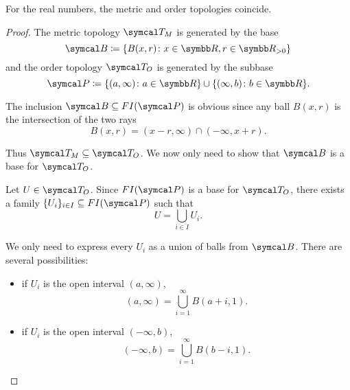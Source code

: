 \begin{theorem}\label{thm:real_metric_and_order_topologies_coincide}
  For the real numbers, the metric and order topologies coincide.
\end{theorem}
\begin{proof}
  The metric topology \( \Cal{T}_M \) is generated by the base
  \begin{equation*}
    \Cal{B} \coloneqq \{ B(x, r) \colon x \in \BR, r \in \BR_{>0} \}
  \end{equation*}
  and the order topology \( \Cal{T}_O \) is generated by the subbase
  \begin{equation*}
    \Cal{P} \coloneqq \{ (a, \infty) \colon a \in \BR \} \cup \{ (\infty, b) \colon b \in \BR \}.
  \end{equation*}

  The inclusion \( \Cal{B} \subseteq FI(\Cal{P}) \) is obvious since any ball \( B(x, r) \) is the intersection of the two rays
  \begin{equation*}
    B(x, r) = (x - r, \infty) \cap (-\infty, x + r).
  \end{equation*}

  Thus \( \Cal{T}_M \subseteq \Cal{T}_O \). We now only need to show that \( \Cal{B} \) is a base for \( \Cal{T}_O \).

  Let \( U \in \Cal{T}_O \). Since \( FI(\Cal{P}) \) is a base for \( \Cal{T}_O \), there exists a family \( \{ U_i \}_{i \in I} \subseteq FI(\Cal{P}) \) such that
  \begin{equation*}
    U = \bigcup_{i \in I} U_i.
  \end{equation*}

  We only need to express every \( U_i \) as a union of balls from \( \Cal{B} \). There are several possibilities:
  \begin{itemize}
    \item if \( U_i \) is the open interval \( (a, \infty) \),
    \begin{equation*}
      (a, \infty) = \bigcup_{i=1}^\infty B(a + i, 1).
    \end{equation*}

    \item if \( U_i \) is the open interval \( (-\infty, b) \),
    \begin{equation*}
      (-\infty, b) = \bigcup_{i=1}^\infty B(b - i, 1).
    \end{equation*}


\end{itemize}
\end{proof}
